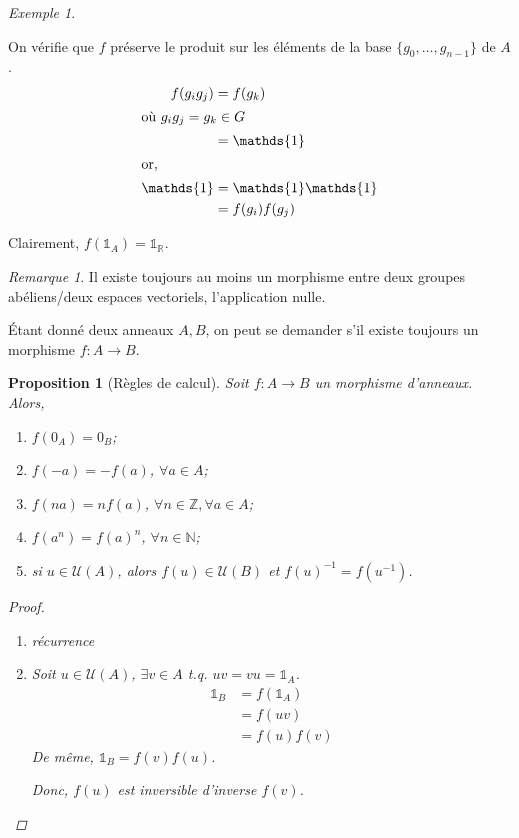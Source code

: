 \documentclass{report}
\newtheorem*{prop}{Proposition}
\theoremstyle{definition}
\theoremstyle{remark}
\newtheorem*{exem}{Exemple}
\newtheorem*{rmq}{Remarque}
\def\NN{\mathbb{N}}
\def\ZZ{\mathbb{Z}}
\def\RR{\mathbb{R}}
\def\id{\mathds{1}}
\begin{document}
\begin{exem}
\begin{enumerate}
			On v\'erifie que $f$ pr\'eserve le produit sur les \'el\'ements de la base $\{g_0,\dots,g_{n-1}\}$ de $A$.
			\begin{align*}
				f(g_ig_j)&= f(g_k)\\
				\shortintertext{o\`u $g_ig_j=g_k\in G$}
				&= \id\\
				\intertext{or,}
				\id&= \id\id\\
				&= f(g_i)f(g_j)
			\end{align*}

			Clairement, $f(\id_A)=\id_\RR$.
		\end{enumerate}
	\end{exem}

	\begin{rmq}
		Il existe toujours au moins un morphisme entre deux groupes ab\'eliens/deux espaces vectoriels, l'application nulle.
	\end{rmq}

	\'Etant donn\'e deux anneaux $A,B$, on peut se demander s'il existe toujours un morphisme $f:A\to B$.

	\begin{prop}[R\`egles de calcul]
		Soit $f:A\to B$ un morphisme d'anneaux. Alors,
		\begin{enumerate}
			\item $f(0_A)=0_B$;
			\item $f(-a)=-f(a)$, $\forall a\in A$;
			\item $f(na)=nf(a)$, $\forall n\in\ZZ,\forall a\in A$;
			\item $f(a^n)=f(a)^n$, $\forall n\in\NN$;
			\item si $u\in\mathcal{U}(A)$, alors $f(u)\in\mathcal{U}(B)$ et $f(u)^{-1}=f(u^{-1})$.
		\end{enumerate}
		\begin{proof}~

			\begin{enumerate}[start=4]
				\item r\'ecurrence
				\item Soit $u\in\mathcal{U}(A)$, $\exists v\in A$ t.q. $uv=vu=\id_A$.
				\begin{align*}
					\id_B&= f(\id_A)\\
					&= f(uv)\\
					&= f(u)f(v)
				\end{align*}
				De m\^eme, $\id_B=f(v)f(u)$.

				Donc, $f(u)$ est inversible d'inverse $f(v)$.
			\end{enumerate}
		\end{proof}
	\end{prop}
\end{document}
